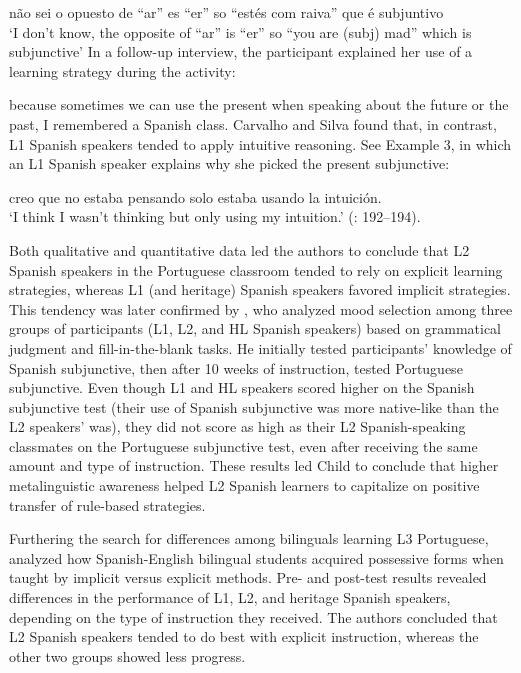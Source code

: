 \documentclass[output=paper]{../langscibook}
\begin{document}
\ea não sei o opuesto de ``ar'' es ``er'' so ``estés com raiva'' que é subjuntivo\\
\glt `I don’t know, the opposite of ``ar'' is ``er'' so ``you are (subj) mad'' which is subjunctive'
\z
In a follow-up interview, the participant explained her use of a learning strategy during the activity:

\ea{} because sometimes we can use the present when speaking about the future or the past, I remembered a Spanish class.\z
Carvalho and Silva found that, in contrast, L1 Spanish speakers tended to apply intuitive reasoning. See Example 3, in which an L1 Spanish speaker explains why she picked the present subjunctive:

\ea creo que no estaba pensando solo estaba usando la intuición.\\
\glt `I think I wasn’t thinking but only using my intuition.' (\citealt{CarvalhoSilva2006}: 192–194).
\z

Both qualitative and quantitative data led the authors to conclude that L2 Spanish speakers in the Portuguese classroom tended to rely on explicit learning strategies, whereas L1 (and heritage) Spanish speakers favored implicit strategies. This tendency was later confirmed by \citet{Child2014}, who analyzed mood selection among three groups of participants (L1, L2, and HL Spanish speakers) based on grammatical judgment and fill-in-the-blank tasks. He initially tested participants’ knowledge of Spanish subjunctive, then after 10 weeks of instruction, tested Portuguese subjunctive. Even though L1 and HL speakers scored higher on the Spanish subjunctive test (their use of Spanish subjunctive was more native-like than the L2 speakers’ was), they did not score as high as their L2 Spanish-speaking classmates on the Portuguese subjunctive test, even after receiving the same amount and type of instruction. These results led Child to conclude that higher metalinguistic awareness helped L2 Spanish learners to capitalize on positive transfer of rule-based strategies.

Furthering the search for differences among bilinguals learning L3 Portuguese, \citet{KoikeGualda2008} analyzed how Spanish-English bilingual students acquired possessive forms when taught by implicit versus explicit methods. Pre- and post-test results revealed differences in the performance of L1, L2, and heritage Spanish speakers, depending on the type of instruction they received. The authors concluded that L2 Spanish speakers tended to do best with explicit instruction, whereas the other two groups showed less progress.
\end{document}
